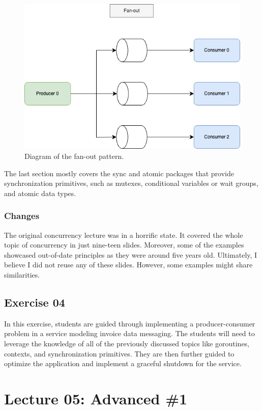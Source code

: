 \documentclass[
  digital,
  color,
  oneside,
  nosansbold,
  nocolorbold,
  nolof,
  nolot,
]{fithesis4}
\begin{document}
\begin{figure}[H]
    \centering
    \includegraphics[width=12cm]{figures/fanout.png}
    \caption{Diagram of the fan-out pattern.}
    \label{fig:fanout}
\end{figure}

The last section mostly covers the sync and atomic packages that provide synchronization primitives, such as mutexes, conditional variables or wait groups, and atomic data types.

\subsubsection{Changes}

The original concurrency lecture was in a horrific state. It covered the whole topic of concurrency in just nine-teen slides. Moreover, some of the examples showcased out-of-date principles as they were around five years old. Ultimately, I believe I did not reuse any of these slides. However, some examples might share similarities.

\subsection{Exercise 04}

In this exercise, students are guided through implementing a producer-consumer problem in a service modeling invoice data messaging. The students will need to leverage the knowledge of all of the previously discussed topics like goroutines, contexts, and synchronization primitives. They are then further guided to optimize the application and implement a graceful shutdown for the service.

\section{Lecture 05: Advanced \#1}
\end{document}
